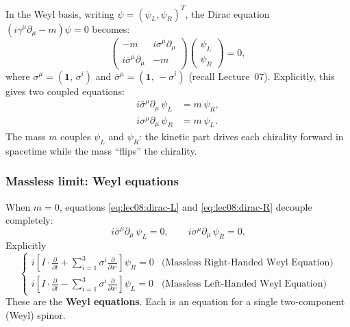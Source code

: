 \documentclass[../main.tex]{subfiles}
\begin{document}
In the Weyl basis, writing $\psi = (\psi_L, \psi_R)^T$, the Dirac equation $(i\gamma^\mu\partial_\mu - m)\psi = 0$ becomes:
\begin{equation}
  \begin{pmatrix}
    -m & i\sigma^\mu\partial_\mu \\
    i\bar\sigma^\mu\partial_\mu & -m
  \end{pmatrix}
  \begin{pmatrix}\psi_L \\ \psi_R\end{pmatrix} = 0,
  \label{eq:lec08:dirac-weyl-matrix}
\end{equation}
where $\sigma^\mu = (\mathbf{1},\,\sigma^i)$ and $\bar\sigma^\mu = (\mathbf{1},\,-\sigma^i)$ (recall Lecture~07).  Explicitly, this gives two coupled equations:
\begin{align}
  i\bar\sigma^\mu\partial_\mu\,\psi_L &= m\,\psi_R, \label{eq:lec08:dirac-L}\\
  i\sigma^\mu\partial_\mu\,\psi_R     &= m\,\psi_L. \label{eq:lec08:dirac-R}
\end{align}
The mass $m$ couples $\psi_L$ and $\psi_R$: the kinetic part drives each chirality forward in spacetime while the mass ``flips'' the chirality.

\subsubsection*{Massless limit: Weyl equations}

When $m = 0$, equations \eqref{eq:lec08:dirac-L} and \eqref{eq:lec08:dirac-R} decouple completely:
\begin{equation}
  \boxed{
  i\bar\sigma^\mu\partial_\mu\,\psi_L = 0, \qquad i\sigma^\mu\partial_\mu\,\psi_R = 0.
  }\label{eq:lec08:weyl-equations}
\end{equation}
Explicitly
\begin{equation}
    \begin{cases}
i \left[ I \cdot \frac{\partial}{\partial t} + \sum_{i=1}^3 \sigma^i \frac{\partial}{\partial x^i} \right] \psi_R = 0 & \text{(Massless Right-Handed Weyl Equation)} \\
i \left[ I \cdot \frac{\partial}{\partial t} - \sum_{i=1}^3 \sigma^i \frac{\partial}{\partial x^i} \right] \psi_L = 0 & \text{(Massless Left-Handed Weyl Equation)}
\end{cases}
\end{equation}
These are the \textbf{Weyl equations}.  Each is an equation for a single two-component (Weyl) spinor.
\end{document}
